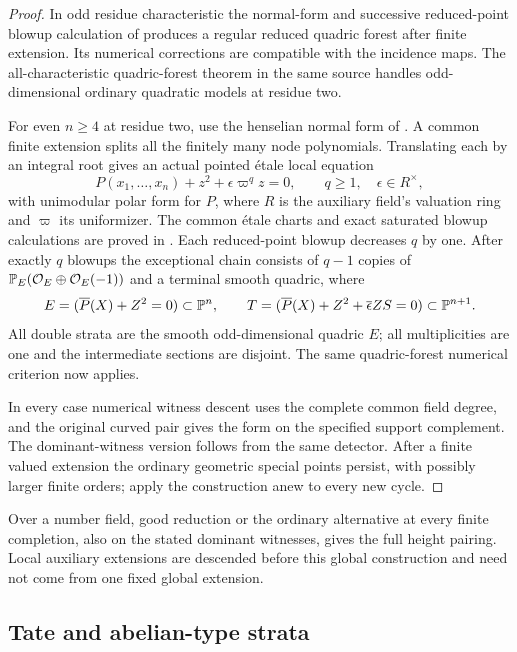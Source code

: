 \begin{proof}
In odd residue characteristic the normal-form and successive
reduced-point blowup calculation of \cite{InternalOrdinary}
produces a regular reduced quadric forest after finite extension.
Its numerical corrections are compatible with the incidence maps.
The all-characteristic quadric-forest theorem in the same source
handles odd-dimensional ordinary quadratic models at residue two.

For even $n\geq4$ at residue two, use the henselian normal form of
\cite[Lemma 4(ii)]{JannsenSaito}. A common finite extension splits
all the finitely many node polynomials. Translating each by an
integral root gives an actual pointed \'etale local equation
\[
 P(x_1,\ldots,x_n)+z^2+\epsilon\varpi^qz=0,
 \qquad q\geq1,\quad\epsilon\in R^\times,
\]
with unimodular polar form for $P$, where $R$ is the auxiliary
field's valuation ring and $\varpi$ its uniformizer. The common \'etale charts and
exact saturated blowup calculations are proved in
\cite[common \'etale neighborhoods and native degenerate-node chains]
{InternalOrdinary}. Each reduced-point blowup decreases $q$ by
one. After exactly $q$ blowups the exceptional chain consists of
$q-1$ copies of
$\mathbb P_E(\mathcal O_E\oplus\mathcal O_E(-1))$ and a terminal
smooth quadric, where
\[
 E=(\overline P(X)+Z^2=0)\subset\mathbb P^n,
 \qquad
 T=(\overline P(X)+Z^2+\overline\epsilon ZS=0)
       \subset\mathbb P^{n+1}.
\]
All double strata are the smooth odd-dimensional quadric $E$;
all multiplicities are one and the intermediate sections are
disjoint. The same quadric-forest numerical criterion now applies.

In every case numerical witness descent uses the complete common
field degree, and the original curved pair gives the form on the
specified support complement. The dominant-witness version follows
from the same detector. After a finite valued extension the ordinary
geometric special points persist, with possibly larger finite
orders; apply the construction anew to every new cycle.
\end{proof}

Over a number field, good reduction or the ordinary alternative at
every finite completion, also on the stated dominant witnesses,
gives the full height pairing. Local auxiliary extensions are
descended before this global construction and need not come from
one fixed global extension.

\subsection{Tate and abelian-type strata}

